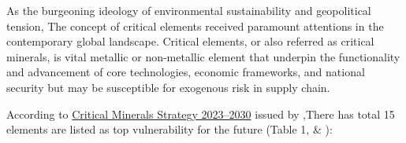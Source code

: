 \documentclass[preprint, 3p,
authoryear]{elsarticle} %
\begin{document}
As the burgeoning ideology of environmental sustainability and
geopolitical tension, The concept of critical elements received
paramount attentions in the contemporary global landscape. Critical
elements, or also referred as critical minerals, is vital metallic or
non-metallic element that underpin the functionality and advancement of
core technologies, economic frameworks, and national security but may be
susceptible for exogenous risk in supply chain.

According to
\href{https://www.industry.gov.au/publications/critical-minerals-strategy-2023-2030}{Critical
Minerals Strategy 2023--2030} issued by \citet{geoscience2023},There has
total 15 elements are listed as top vulnerability for the future (Table
1, \citet{Coyne2023} \& \citet{Skirrow2013} ):

\begingroup
\fontsize{7.5pt}{9.0pt}\selectfont
\setlength{\LTpost}{0mm}
\end{document}
